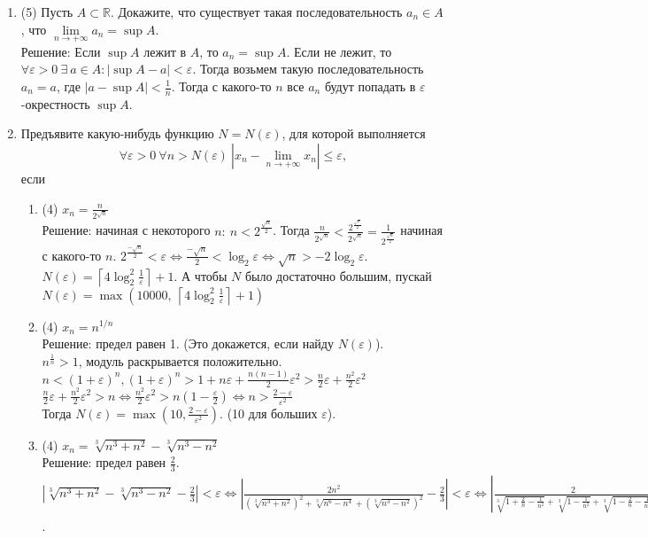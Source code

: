 \documentclass[a4paper]{article}
\def\eps{\varepsilon}
\begin{document}
\begin{enumerate}
	\item (5) Пусть $A\subset\mathbb R$. Докажите, что существует такая последовательность $a_n\in A$, что $\lim\limits_{n\to +\infty} a_n = \sup A$.\\
	Решение: Если $\sup A$ лежит в $A$, то $a_n = \sup A$. Если не лежит, то $\forall \eps > 0\ \exists\ a\in A:|\sup A - a| < \eps$. Тогда возьмем такую последовательность $a_n = a$, где $|a - \sup A| < \frac{1}{n}$. Тогда с какого-то $n$ все $a_n$ будут попадать в $\eps$-окрестность $\sup A$. 
    \item Предъявите какую-нибудь функцию $N = N(\eps)$, для которой выполняется
    \[
        \forall \eps>0\ \forall n> N(\eps)\ |x_n-\lim\limits_{n\to+\infty} x_n|\leq \eps,
    \]
    если
    \begin{enumerate}
        \item (4) $x_n = \frac{n}{2^{\sqrt{n}}}$\\
        Решение: начиная с некоторого $n:\ n < 2^{\frac{\sqrt{n}}{2}}$. Тогда $\frac{n}{2^{\sqrt{n}}} < \frac{2^{\frac{\sqrt{n}}{2}}}{2^{\sqrt{n}}} = \frac{1}{2^{\frac{\sqrt{n}}{2}}}$ начиная с какого-то $n$. $2^{\frac{-\sqrt{n}}{2}} < \eps \Leftrightarrow \frac{-\sqrt{n}}{2} < \log_2\eps \Leftrightarrow \sqrt{n} > -2\log_2\eps$. $N(\eps) = \left \lceil{4\log^2_2\frac{1}{\eps}}\right \rceil + 1$. А чтобы $N$ было достаточно большим, пускай $N(\eps) = \max(10000,\ \left \lceil{4\log^2_2\frac{1}{\eps}}\right \rceil + 1)$
        \item (4) $x_n = n^{1/n}$\\
        Решение: предел равен 1. (Это докажется, если найду $N(\eps)$).\\ 
        $n^{\frac{1}{n}} > 1$, модуль раскрывается положительно.\\
        $n < (1 + \eps)^n, (1 + \eps)^n > 1 + n\eps + \frac{n(n-1)}{2}\eps^2 > \frac{n}{2}\eps + \frac{n^2}{2}\eps^2$\\
        $\frac{n}{2}\eps + \frac{n^2}{2}\eps^2 > n \Leftrightarrow \frac{n^2}{2}\eps^2 > n(1 - \frac{\eps}{2}) \Leftrightarrow n > \frac{2-\eps}{\eps^2}$\\
        Тогда $N(\eps) = \max(10, \frac{2 - \eps}{\eps^2})$. (10 для больших $\eps$). 
        \item (4) $x_n = \sqrt[3]{n^3 + n^2} - \sqrt[3]{n^3 - n^2}$\\
        Решение: предел равен $\frac{2}{3}$. $|\sqrt[3]{n^3 + n^2} - \sqrt[3]{n^3 - n^2} - \frac{2}{3}| < \eps \Leftrightarrow |\frac{2n^2}{(\sqrt[3]{n^3 + n^2})^2 + \sqrt[3]{n^6 - n^4} + (\sqrt[3]{n^3 - n^2})^2} - \frac{2}{3}| < \eps \Leftrightarrow |\frac{2}{\sqrt[3]{1 + \frac{2}{n} - \frac{1}{n^2}} + \sqrt[3]{1 - \frac{1}{n^2}} + \sqrt[3]{1 - \frac{2}{n} - \frac{1}{n^2}}} - \frac{2}{3}| < \eps \Leftrightarrow 2|\frac{1 - \sqrt[3]{1 + \frac{2}{n} - \frac{1}{n^2}} + 1 - \sqrt[3]{1 - \frac{1}{n^2}} + 1 - \sqrt[3]{1 - \frac{2}{n} - \frac{1}{n^2}}}{3(\sqrt[3]{1 + \frac{2}{n} - \frac{1}{n^2}} + \sqrt[3]{1 - \frac{1}{n^2}} + \sqrt[3]{1 - \frac{2}{n} - \frac{1}{n^2}})}| < \eps$.

\end{enumerate}
\end{enumerate}
\end{document}
